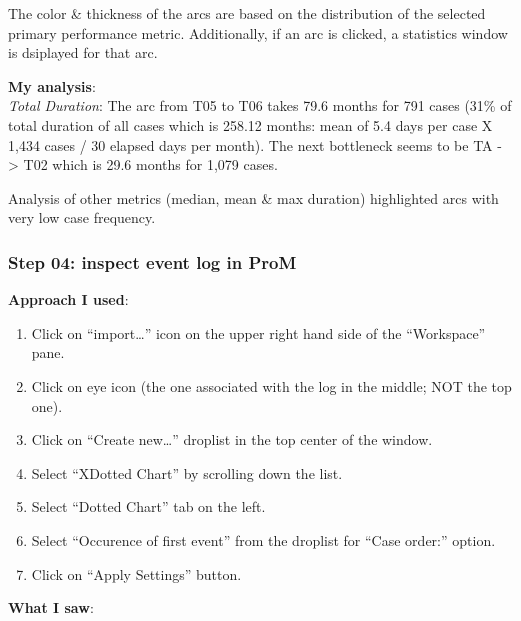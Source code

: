 \documentclass[]{article}
\begin{document}
The color \& thickness of the arcs are based on the distribution of the
selected primary performance metric. Additionally, if an arc is clicked,
a statistics window is dsiplayed for that arc.

\textbf{My analysis}:\\\emph{Total Duration}: The arc from T05 to T06
takes 79.6 months for 791 cases (31\% of total duration of all cases
which is 258.12 months: mean of 5.4 days per case X 1,434 cases / 30
elapsed days per month). The next bottleneck seems to be TA
-\textgreater{} T02 which is 29.6 months for 1,079 cases.

Analysis of other metrics (median, mean \& max duration) highlighted
arcs with very low case frequency.

\subsubsection{Step 04: inspect event log in
ProM}\label{step-04-inspect-event-log-in-prom}

\textbf{Approach I used}:

\begin{enumerate}
\def\labelenumi{\arabic{enumi}.}
\itemsep1pt\parskip0pt
\item
  Click on ``import\ldots{}'' icon on the upper right hand side of the
  ``Workspace'' pane.\\
\item
  Click on eye icon (the one associated with the log in the middle; NOT
  the top one).\\
\item
  Click on ``Create new\ldots{}'' droplist in the top center of the
  window.\\
\item
  Select ``XDotted Chart'' by scrolling down the list.
\item
  Select ``Dotted Chart'' tab on the left.
\item
  Select ``Occurence of first event'' from the droplist for ``Case
  order:'' option.\\
\item
  Click on ``Apply Settings'' button.
\end{enumerate}

\textbf{What I saw}:
\end{document}
